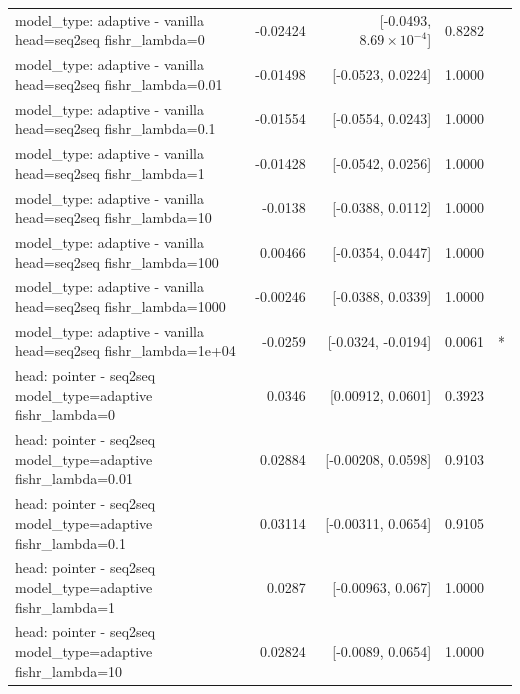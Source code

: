 \documentclass[10pt]{article}
\makeatletter
\newcommand{\stackcell}[1]{\begin{tabular}[t]{@{}l@{}}#1\end{tabular}}
\makeatother
\begin{document}
{\begin{longtable}{lrrrl}
\stackcell{model\_type: adaptive - vanilla\\\footnotesize head=seq2seq fishr\_lambda=0 } & -0.02424 & [-0.0493, $8.69\times10^{-4}$] & 0.8282 & \\
\stackcell{model\_type: adaptive - vanilla\\\footnotesize head=seq2seq fishr\_lambda=0.01 } & -0.01498 & [-0.0523, 0.0224] & 1.0000 & \\
\stackcell{model\_type: adaptive - vanilla\\\footnotesize head=seq2seq fishr\_lambda=0.1 } & -0.01554 & [-0.0554, 0.0243] & 1.0000 & \\
\stackcell{model\_type: adaptive - vanilla\\\footnotesize head=seq2seq fishr\_lambda=1 } & -0.01428 & [-0.0542, 0.0256] & 1.0000 & \\
\stackcell{model\_type: adaptive - vanilla\\\footnotesize head=seq2seq fishr\_lambda=10 } & -0.0138 & [-0.0388, 0.0112] & 1.0000 & \\
\stackcell{model\_type: adaptive - vanilla\\\footnotesize head=seq2seq fishr\_lambda=100 } & 0.00466 & [-0.0354, 0.0447] & 1.0000 & \\
\stackcell{model\_type: adaptive - vanilla\\\footnotesize head=seq2seq fishr\_lambda=1000 } & -0.00246 & [-0.0388, 0.0339] & 1.0000 & \\
\stackcell{model\_type: adaptive - vanilla\\\footnotesize head=seq2seq fishr\_lambda=1e+04 } & -0.0259 & [-0.0324, -0.0194] & 0.0061 & *\\
\stackcell{head: pointer - seq2seq\\\footnotesize model\_type=adaptive fishr\_lambda=0 } & 0.0346 & [0.00912, 0.0601] & 0.3923 & \\
\stackcell{head: pointer - seq2seq\\\footnotesize model\_type=adaptive fishr\_lambda=0.01 } & 0.02884 & [-0.00208, 0.0598] & 0.9103 & \\
\stackcell{head: pointer - seq2seq\\\footnotesize model\_type=adaptive fishr\_lambda=0.1 } & 0.03114 & [-0.00311, 0.0654] & 0.9105 & \\
\stackcell{head: pointer - seq2seq\\\footnotesize model\_type=adaptive fishr\_lambda=1 } & 0.0287 & [-0.00963, 0.067] & 1.0000 & \\
\stackcell{head: pointer - seq2seq\\\footnotesize model\_type=adaptive fishr\_lambda=10 } & 0.02824 & [-0.0089, 0.0654] & 1.0000 & \\

\end{longtable}}
\end{document}
